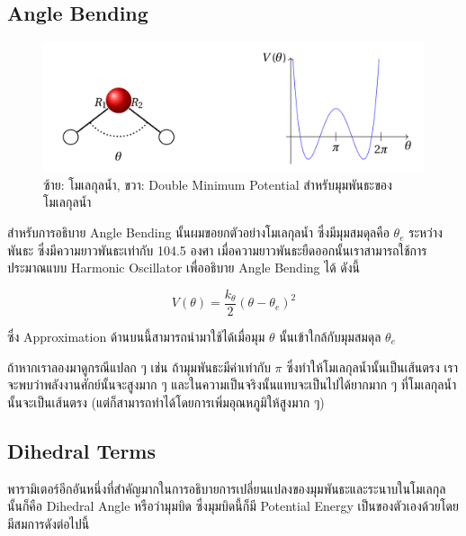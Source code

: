 \subsection{Angle Bending}

\begin{figure}[htbp]
  \centering
  \includegraphics[width=0.8\linewidth]{fig/water-angle-bending.png}
  \caption{ซ้าย: โมเลกุลน้ำ, ขวา: Double Minimum Potential สำหรับมุมพันธะของโมเลกุลน้ำ}
  \label{fig:water_angle_bending}
\end{figure}

สำหรับการอธิบาย Angle Bending นั้นผมขอยกตัวอย่างโมเลกุลน้ำ  ซึ่งมีมุมสมดุลคือ $\theta_{e}$ ระหว่างพันธะ 
ซึ่งมีความยาวพันธะเท่ากับ 104.5 องศา เมื่อความยาวพันธะยืดออกนั้นเราสามารถใช้การประมาณแบบ Harmonic Oscillator เพื่ออธิบาย Angle
Bending ได้ ดังนี้

\begin{equation}
  V(\theta)
  =
  \frac{k_{\theta}}{2}
  (\theta - \theta_{e})^{2}
\end{equation}

\noindent ซึ่ง Approximation ด้านบนนี้สามารถนำมาใช้ได้เมื่อมุม $\theta$ นั้นเข้าใกล้กับมุมสมดุล $\theta_{e}$

ถ้าหากเราลองมาดูกรณีแปลก ๆ เช่น ถ้ามุมพันธะมีค่าเท่ากับ $\pi$ ซึ่งทำให้โมเลกุลน้ำนั้นเป็นเส้นตรง เราจะพบว่าพลังงานศักย์นั้นจะสูงมาก ๆ
และในความเป็นจริงนั้นแทบจะเป็นไปได้ยากมาก ๆ ที่โมเลกุลน้ำนั้นจะเป็นเส้นตรง (แต่ก็สามารถทำได้โดยการเพิ่มอุณหภูมิให้สูงมาก ๆ)

\subsection{Dihedral Terms}

พารามิเตอร์อีกอันหนึ่งที่สำคัญมากในการอธิบายการเปลี่ยนแปลงของมุมพันธะและระนาบในโมเลกุลนั้นก็คือ Dihedral Angle หรือว่ามุมบิด
ซึ่งมุมบิดนี้ก็มี Potential Energy เป็นของตัวเองด้วยโดยมีสมการดังต่อไปนี้

